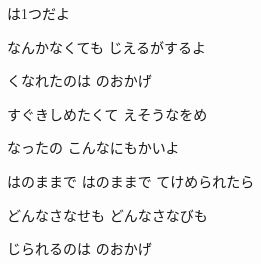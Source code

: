 \documentclass[14pt]{ltjsarticle}
\begin{document}
{  は1つだよ
  \jisho{}

  なんかなくても じえるがするよ
  \jisho{}

  くなれたのは のおかげ
  \jisho{}

\item
  すぐきしめたくて えそうなをめ
  \jisho{}

  なったの こんなにもかいよ
  \jisho{}

\item
  はのままで はのままで てけめられたら
  \jisho{}

  どんなさなせも どんなさなびも
  \jisho{}

  じられるのは のおかげ
  \jisho{}

  
}
\end{document}
